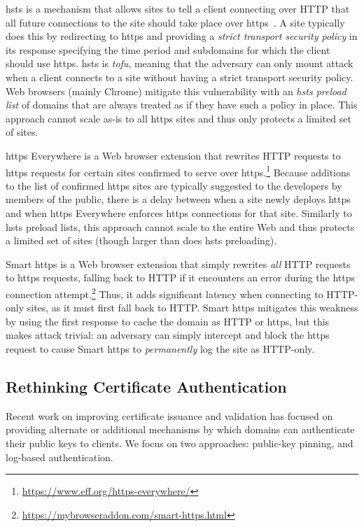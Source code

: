 \ac{hsts} is a mechanism that allows sites to tell a client connecting over HTTP
that all future connections to the site should take place over
\ac{https}~\cite{rfc6797}. A site typically does this by redirecting to
\ac{https} and providing a \emph{strict transport security policy} in its
response specifying the time period and subdomains for which the client should
use \ac{https}. \ac{hsts} is \emph{\ac{tofu}}, meaning that the adversary can
only mount  attack when a client connects to a site without having a
strict transport security policy. Web browsers (mainly Chrome) mitigate this
vulnerability with an \emph{\ac{hsts} preload list} of domains that are always
treated as if they have such a policy in place. This approach cannot scale as-is
to all \ac{https} sites and thus only protects a limited set of sites.

\ac{https} Everywhere is a Web browser extension that rewrites HTTP requests to
\ac{https} requests for certain sites confirmed to serve over
\ac{https}.\footnote{\url{https://www.eff.org/https-everywhere/}} Because
additions to the list of confirmed \ac{https} sites are typically suggested to
the developers by members of the public, there is a delay between when a site
newly deploys \ac{https} and when \ac{https} Everywhere enforces \ac{https}
connections for that site. Similarly to \ac{hsts} preload lists, this approach
cannot scale to the entire Web and thus protects a limited set of sites (though
larger than does \ac{hsts} preloading).

Smart \ac{https} is a Web browser extension that simply rewrites \emph{all} HTTP
requests to \ac{https} requests, falling back to HTTP if it encounters an error
during the \ac{https} connection
attempt.\footnote{\url{https://mybrowseraddon.com/smart-https.html}} Thus, it
adds significant latency when connecting to HTTP-only sites, as it must first
fall back to HTTP. Smart \ac{https} mitigates this weakness by using the first
response to cache the domain as HTTP or \ac{https}, but this makes 
attack trivial: an adversary can simply intercept and block the \ac{https}
request to cause Smart \ac{https} to \emph{permanently} log the site as
HTTP-only.

\subsection{Rethinking Certificate Authentication}
\label{sec:background:issuance}

Recent work on improving certificate issuance and validation has focused on
providing alternate or additional mechanisms by which domains can authenticate
their public keys to clients. We focus on two approaches: public-key pinning,
and log-based authentication.

